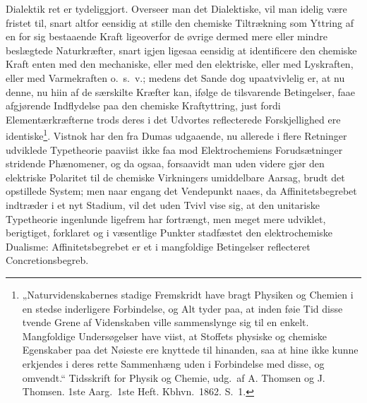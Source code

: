 \documentclass[12pt,a4paper]{book}
\begin{document}
\setcounter{footnote}{0}
Dialektik ret er tydeliggjort. Overseer man det Dialektiske,
vil man idelig være fristet til, snart altfor eensidig at stille
den chemiske Tiltrækning som Yttring af en for sig bestaaende
Kraft ligeoverfor de øvrige dermed mere eller mindre beslægtede
Naturkræfter, snart igjen ligesaa eensidig at identificere den
chemiske Kraft enten med den mechaniske, eller med den
elektriske, eller med Lyskraften, eller med Varmekraften o.\ s.\ v.;
medens det Sande dog upaatvivlelig er, at nu denne, nu hiin af
de særskilte Kræfter kan, ifølge de tilsvarende Betingelser, faae
afgjørende Indflydelse paa den chemiske Kraftyttring, just fordi
Elementærkræfterne trods deres i det Udvortes reflecterede
Forskjellighed ere identiske\footnote{„Naturvidenskabernes stadige
Fremskridt have bragt Physiken og Chemien i en stedse inderligere
Forbindelse, og Alt tyder paa, at inden føie Tid disse tvende Grene
af Videnskaben ville sammenslynge sig til en enkelt. Mangfoldige
Undersøgelser have viist, at Stoffets physiske og chemiske Egenskaber
paa det Nøieste ere knyttede til hinanden, saa at hine ikke kunne
erkjendes i deres rette Sammenhæng uden i Forbindelse med disse, og
omvendt.“ Tidsskrift for Physik og Chemie, udg.\ af A. Thomsen og
J. Thomsen. 1ste Aarg.\ 1ste Heft. Kbhvn.\ 1862. S.\ 1.}. Vistnok har
den fra Dumas udgaaende, nu allerede i flere Retninger
udviklede Typetheorie paaviist ikke faa mod Elektrochemiens
Forudsætninger stridende Phænomener, og da ogsaa, forsaavidt
man uden videre gjør den elektriske Polaritet til de chemiske
Virkningers umiddelbare Aarsag, brudt det opstillede System;
men naar engang det Vendepunkt naaes, da Affinitetsbegrebet
indtræder i et nyt Stadium, vil det uden Tvivl vise sig, at
den unitariske Typetheorie ingenlunde ligefrem har fortrængt,
men meget mere udviklet, berigtiget, forklaret og i væsentlige
Punkter stadfæstet den elektrochemiske Dualisme: Affinitetsbegrebet
er et i mangfoldige Betingelser reflecteret Concretionsbegreb.
\end{document}
